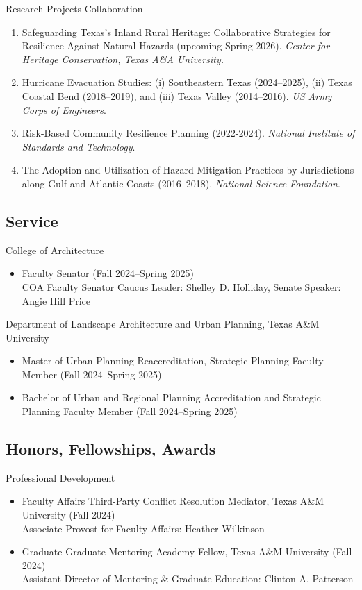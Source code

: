 \documentclass[11pt,oneside]{article}
\begin{document}
\vspace{1pt}

{Research Projects Collaboration}
\begin{enumerate}[leftmargin=20pt]
\item Safeguarding Texas's Inland Rural Heritage: Collaborative Strategies for Resilience Against Natural Hazards (upcoming Spring 2026). \emph{Center for Heritage Conservation, Texas A\&A University.}
\item Hurricane Evacuation Studies: (i) Southeastern Texas (2024--2025), (ii) Texas Coastal Bend (2018--2019), and (iii) Texas Valley (2014--2016). \emph{US Army Corps of Engineers}.
\item Risk-Based Community Resilience Planning (2022-2024). \emph{National Institute of Standards and Technology}.
\item The Adoption and Utilization of Hazard Mitigation Practices by Jurisdictions along Gulf and Atlantic Coasts (2016--2018). \emph{National Science Foundation}.
\end{enumerate}

\subsection*{Service}
College of Architecture
\begin{itemize}[leftmargin=20pt]
\item Faculty Senator (Fall 2024--Spring 2025)\\
      COA Faculty Senator Caucus Leader: Shelley D. Holliday, Senate Speaker: Angie Hill Price
\end{itemize}
Department of Landscape Architecture and Urban Planning, Texas A\&M University
\begin{itemize}[leftmargin=20pt]
\item Master of Urban Planning Reaccreditation, Strategic Planning Faculty Member (Fall 2024--Spring 2025)\\
\item Bachelor of Urban and Regional Planning Accreditation and Strategic Planning Faculty Member (Fall 2024--Spring 2025)\\
\end{itemize}

\subsection*{Honors, Fellowships, Awards}

{Professional Development}
\begin{itemize}[leftmargin=20pt]
\item Faculty Affairs Third-Party Conflict Resolution Mediator, Texas A\&M University (Fall 2024)\\
      Associate Provost for Faculty Affairs: Heather Wilkinson
\item Graduate Graduate Mentoring Academy Fellow, Texas A\&M University (Fall 2024)\\
      Assistant Director of Mentoring \& Graduate Education: Clinton A. Patterson
\end{itemize}
\end{document}
